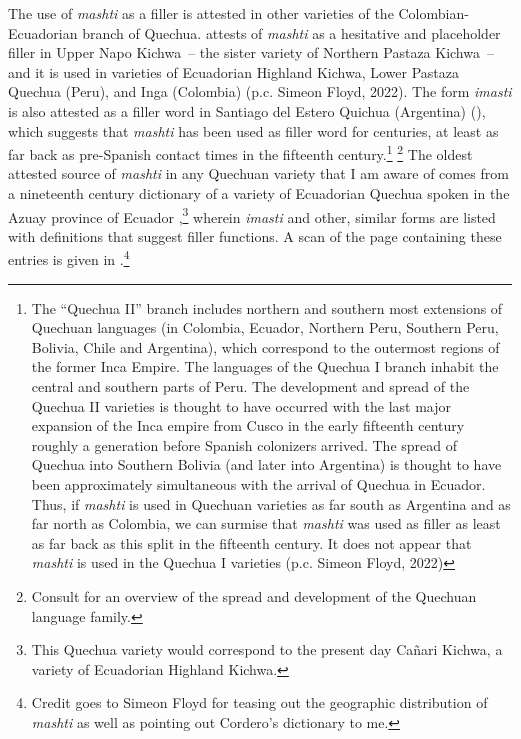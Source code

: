 \documentclass[output=paper]{langscibook}
\begin{document}
The use of \textit{mashti} as a filler is attested in other varieties of the Colombian-Ecuadorian branch of Quechua. \citet{Grzech2016a} attests of \textit{mashti} as a hesitative and placeholder filler in Upper Napo Kichwa~-- the sister variety of Northern Pastaza Kichwa~-- and it is used in varieties of Ecuadorian Highland Kichwa, Lower Pastaza Quechua (Peru), and Inga (Colombia) (p.c. Simeon Floyd, 2022). The form \textit{imasti} is also attested as a filler word in Santiago del Estero Quichua (Argentina) (\citealt{AlbarracindeAlderetes2009}), which suggests that \textit{mashti} has been used as filler word for centuries, at least as far back as pre-Spanish contact times in the fifteenth century.\footnote{The “Quechua II” branch includes northern and southern most extensions of Quechuan languages (in Colombia, Ecuador, Northern Peru, Southern Peru, Bolivia, Chile and Argentina), which correspond to the outermost regions of the former Inca Empire. The languages of the Quechua I branch inhabit the central and southern parts of Peru. The development and spread of the Quechua II varieties is thought to have occurred with the last major expansion of the Inca empire from Cusco in the early fifteenth century roughly a generation before Spanish colonizers arrived. The spread of Quechua into Southern Bolivia (and later into Argentina) is thought to have been approximately simultaneous with the arrival of Quechua in Ecuador. Thus, if \textit{mashti} is used in Quechuan varieties as far south as Argentina and as far north as Colombia, we can surmise that \textit{mashti} was used as filler as least as far back as this split in the fifteenth century. It does not appear that \textit{mashti} is used in the Quechua I varieties (p.c. Simeon Floyd, 2022)} \footnote{Consult \citet[180--191]{Adelaar2004} for an overview of the spread and development of the Quechuan language family.} The oldest attested source of \textit{mashti} in any Quechuan variety that I am aware of comes from a nineteenth century dictionary of a variety of Ecuadorian Quechua spoken in the Azuay province of Ecuador \citep{Cordero1892},\footnote{This Quechua variety would correspond to the present day Cañari Kichwa, a variety of Ecuadorian Highland Kichwa.} wherein \textit{imasti} and other, similar forms are listed with definitions that suggest filler functions. A scan of the page containing these entries is given in .\footnote{Credit goes to Simeon Floyd for teasing out the geographic distribution of \textit{mashti} as well as pointing out Cordero’s dictionary to me.}
\end{document}
